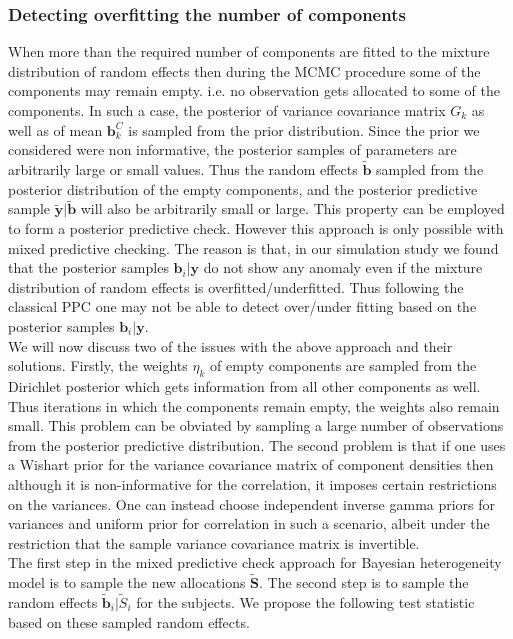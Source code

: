\subsubsection{Detecting overfitting the number of components}
When more than the required number of components are fitted to the mixture distribution of random effects then  during the MCMC procedure some of the components may remain empty. i.e. no observation gets allocated to some of the components. In such a case, the posterior of variance covariance matrix $G_k$ as well as of mean $\boldsymbol{b}_k^C$ is sampled from the prior distribution. Since the prior we considered were non informative, the posterior samples of parameters are arbitrarily large or small values. Thus the random effects $\boldsymbol{\tilde{b}}$ sampled from the posterior distribution of the empty components, and the posterior predictive sample $\boldsymbol{\tilde{y}} | \boldsymbol{\tilde{b}}$ will also be arbitrarily small or large. This property can be employed to form a posterior predictive check. However this approach is only possible with mixed predictive checking. The reason is that, in our simulation study we found that the posterior samples $\boldsymbol{b}_i|\boldsymbol{y}$ do not show any anomaly even if the mixture distribution of random effects is overfitted/underfitted. Thus following the classical PPC one may not be able to detect over/under fitting based on the posterior samples $\boldsymbol{b}_i|\boldsymbol{y}$.\\

We will now discuss two of the issues with the above approach and their solutions. Firstly, the weights $\eta_k$ of empty components are sampled from the Dirichlet posterior which gets information from all other components as well. Thus iterations in which the components remain empty, the weights also remain small. This problem can be obviated by sampling a large number of observations from the posterior predictive distribution. The second problem is that if one uses a Wishart prior for the variance covariance matrix of component densities then although it is non-informative for the correlation, it imposes certain restrictions on the variances. One can instead choose independent inverse gamma priors for variances and uniform prior for correlation in such a scenario, albeit under the restriction that the sample variance covariance matrix is invertible.\\

 The first step in the mixed predictive check approach for Bayesian heterogeneity model is to sample the new allocations $\boldsymbol{\tilde{S}}$. The second step is to sample the random effects $\boldsymbol{\tilde{b}}_i|\tilde{S}_i$ for the subjects. We propose the following test statistic based on these sampled random effects.

